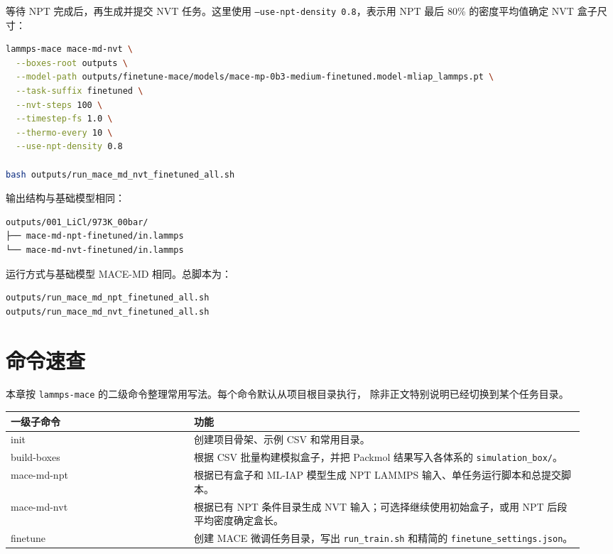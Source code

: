 \documentclass[11pt,a4paper]{article}
\begin{document}
等待 NPT 完成后，再生成并提交 NVT 任务。这里使用 \texttt{--use-npt-density 0.8}，表示用 NPT 最后 80\% 的密度平均值确定 NVT 盒子尺寸：

\begin{lstlisting}[language=bash]
lammps-mace mace-md-nvt \
  --boxes-root outputs \
  --model-path outputs/finetune-mace/models/mace-mp-0b3-medium-finetuned.model-mliap_lammps.pt \
  --task-suffix finetuned \
  --nvt-steps 100 \
  --timestep-fs 1.0 \
  --thermo-every 10 \
  --use-npt-density 0.8

bash outputs/run_mace_md_nvt_finetuned_all.sh
\end{lstlisting}

输出结构与基础模型相同：

\begin{lstlisting}
outputs/001_LiCl/973K_00bar/
├── mace-md-npt-finetuned/in.lammps
└── mace-md-nvt-finetuned/in.lammps
\end{lstlisting}

运行方式与基础模型 MACE-MD 相同。总脚本为：

\begin{lstlisting}
outputs/run_mace_md_npt_finetuned_all.sh
outputs/run_mace_md_nvt_finetuned_all.sh
\end{lstlisting}

\section{命令速查}

本章按 \texttt{lammps-mace} 的二级命令整理常用写法。每个命令默认从项目根目录执行，
除非正文特别说明已经切换到某个任务目录。

\begin{longtable}{@{}>{\ttfamily\small\raggedright\arraybackslash}p{0.30\linewidth}>{\raggedright\arraybackslash}p{0.64\linewidth}@{}}
\toprule
\normalfont 一级子命令 & 功能 \\
\midrule
\endhead
init & 创建项目骨架、示例 CSV 和常用目录。 \\
build-boxes & 根据 CSV 批量构建模拟盒子，并把 Packmol 结果写入各体系的 \texttt{simulation\_box/}。 \\
mace-md-npt & 根据已有盒子和 ML-IAP 模型生成 NPT LAMMPS 输入、单任务运行脚本和总提交脚本。 \\
mace-md-nvt & 根据已有 NPT 条件目录生成 NVT 输入；可选择继续使用初始盒子，或用 NPT 后段平均密度确定盒长。 \\
finetune & 创建 MACE 微调任务目录，写出 \texttt{run\_train.sh} 和精简的 \texttt{finetune\_settings.json}。 \\
\bottomrule
\end{longtable}
\end{document}
